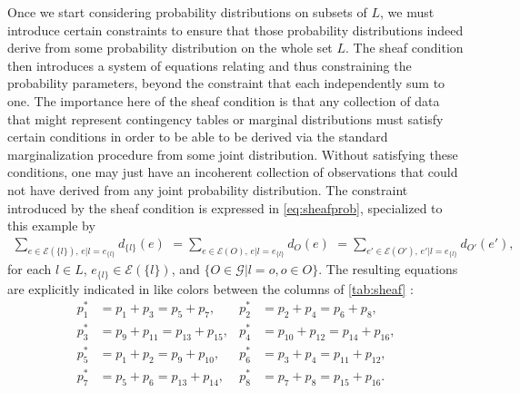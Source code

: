 Once we start considering probability distributions on subsets of $L$, we must introduce certain constraints to ensure that those probability distributions indeed derive from some probability distribution on the whole set $L$.  The sheaf condition then introduces a system of equations relating and thus constraining the probability parameters, beyond the constraint that each independently sum to one. The importance here of the sheaf condition is that any collection of data that might represent contingency tables or marginal distributions must satisfy certain conditions in order to be able to be derived via the standard marginalization procedure from some joint distribution. Without satisfying these conditions, one may just have an incoherent collection of observations that could not have derived from any joint probability distribution.  The constraint introduced by the sheaf condition is expressed in \ref{eq:sheafprob}, specialized to this example by
\begin{eqnarray}\label{eq:sheafprob2}
\sum_{e \in \mathcal{E}(\{l\}),\, e|l=e_{\{l\}}} d_{\{l\}}(e) \,\, = \sum_{e \in \mathcal{E}(O),\, e|l=e_{\{l\}}} d_O(e) \,\, = \sum_{e' \in \mathcal{E}(O'),\, e'|l=e_{\{l\}}} d_{O'}(e'),
\end{eqnarray}
for each $l \in L$, $e_{\{l\}} \in \mathcal{E}(\{l\})$, and $\{O \in \mathcal{G}|l=o, o \in O\}$. The resulting equations are explicitly indicated in like colors between the columns of \ref{tab:sheaf} :
\begin{equation}
\begin{aligned}\label{eq:pparsys}
p^*_1 &= p_1 + p_3 = p_5 + p_7, &
p^*_2 &= p_2 + p_4 = p_6 + p_8,\\
p^*_3 &= p_9 + p_{11} = p_{13} + p_{15},&
p^*_4 &= p_{10} + p_{12} = p_{14} + p_{16},\\
p^*_5 &= p_1 + p_2 = p_9 + p_{10},&
p^*_6 &= p_3 + p_4 = p_{11} + p_{12},\\
p^*_7 &= p_5 + p_6 = p_{13} + p_{14},&
p^*_8 &= p_7 + p_8 = p_{15} + p_{16}.
\end{aligned}
\end{equation}

